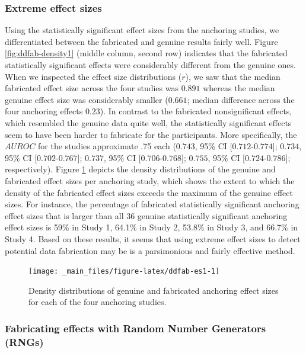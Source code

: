 \documentclass[a5paper]{book}
\begin{document}
\subsubsection{Extreme effect sizes}\label{extreme-effect-sizes-1}

Using the statistically significant effect sizes from the anchoring
studies, we differentiated between the fabricated and genuine results
fairly well. Figure \ref{fig:ddfab-density1} (middle column, second row)
indicates that the fabricated statistically significant effects were
considerably different from the genuine ones. When we inspected the
effect size distributions (\(r\)), we saw that the median fabricated
effect size across the four studies was \(0.891\) whereas the median
genuine effect size was considerably smaller (\(0.661\); median
difference across the four anchoring effects \(0.23\)). In contrast to
the fabricated nonsignificant effects, which resembled the genuine data
quite well, the statistically significant effects seem to have been
harder to fabricate for the participants. More specifically, the
\(AUROC\) for the studies approximate .75 each (\(0.743\), 95\% CI
{[}\(0.712\)-\(0.774\){]}; \(0.734\), 95\% CI {[}\(0.702\)-\(0.767\){]};
\(0.737\), 95\% CI {[}\(0.706\)-\(0.768\){]}; \(0.755\), 95\% CI
{[}\(0.724\)-\(0.786\){]}; respectively). Figure \ref{fig:ddfab-es1}
depicts the density distributions of the genuine and fabricated effect
sizes per anchoring study, which shows the extent to which the density
of the fabricated effect sizes exceeds the maximum of the genuine effect
sizes. For instance, the percentage of fabricated statistically
significant anchoring effect sizes that is larger than all 36 genuine
statistically significant anchoring effect sizes is 59\% in Study 1,
64.1\% in Study 2, 53.8\% in Study 3, and 66.7\% in Study 4. Based on
these results, it seems that using extreme effect sizes to detect
potential data fabrication may be is a parsimonious and fairly effective
method.

\begin{figure}

{\centering \texttt{[image: \_main\_files/figure-latex/ddfab-es1-1]} 

}

\caption{Density distributions of genuine and fabricated anchoring effect sizes for each of the four anchoring studies.}\label{fig:ddfab-es1}
\end{figure}

\subsubsection{Fabricating effects with Random Number Generators
(RNGs)}\label{fabricating-effects-with-random-number-generators-rngs}
\end{document}
